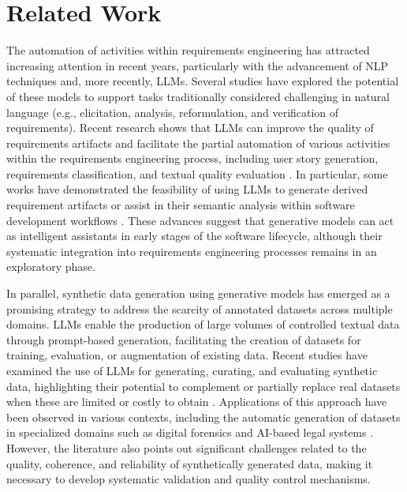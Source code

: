 \documentclass[pdflatex,sn-mathphys-num]{sn-jnl}
\theoremstyle{thmstyleone}%
\theoremstyle{thmstyletwo}%
\theoremstyle{thmstylethree}%
\begin{document}
\section{Related Work}\label{sec2}

The automation of activities within requirements engineering has attracted increasing attention in recent years, particularly with the advancement of NLP techniques and, more recently, LLMs. Several studies have explored the potential of these models to support tasks traditionally considered challenging in natural language (e.g., elicitation, analysis, reformulation, and verification of requirements). Recent research shows that LLMs can improve the quality of requirements artifacts and facilitate the partial automation of various activities within the requirements engineering process, including user story generation, requirements classification, and textual quality evaluation \cite{hematt2025, zadenoori2025}. In particular, some works have demonstrated the feasibility of using LLMs to generate derived requirement artifacts or assist in their semantic analysis within software development workflows \cite{sami2024, proci2025}. These advances suggest that generative models can act as intelligent assistants in early stages of the software lifecycle, although their systematic integration into requirements engineering processes remains in an exploratory phase.

In parallel, synthetic data generation using generative models has emerged as a promising strategy to address the scarcity of annotated datasets across multiple domains. LLMs enable the production of large volumes of controlled textual data through prompt-based generation, facilitating the creation of datasets for training, evaluation, or augmentation of existing data. Recent studies have examined the use of LLMs for generating, curating, and evaluating synthetic data, highlighting their potential to complement or partially replace real datasets when these are limited or costly to obtain \cite{long2024}. Applications of this approach have been observed in various contexts, including the automatic generation of datasets in specialized domains such as digital forensics and AI-based legal systems \cite{fsidi2025, ma2025}. However, the literature also points out significant challenges related to the quality, coherence, and reliability of synthetically generated data, making it necessary to develop systematic validation and quality control mechanisms.
\end{document}
